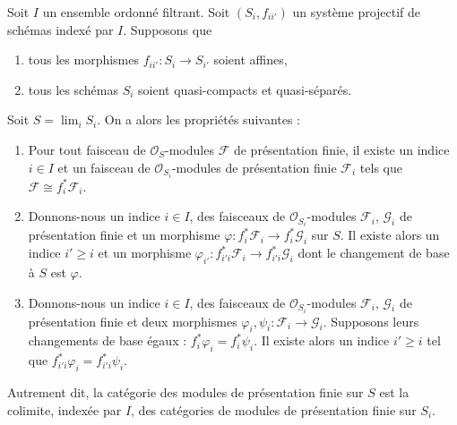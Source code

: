 \begin{lemma}
\label{lemma-descend-modules-finite-presentation}
Soit $I$ un ensemble ordonné filtrant.
Soit $(S_i, f_{ii'})$ un système projectif de schémas indexé par $I$.
Supposons que
\begin{enumerate}
\item tous les morphismes $f_{ii'} : S_i \to S_{i'}$ soient affines,
\item tous les schémas $S_i$ soient quasi-compacts et quasi-séparés.
\end{enumerate}
Soit $S = \lim_i S_i$. On a alors les propriétés suivantes :
\begin{enumerate}
\item Pour tout faisceau de $\mathcal{O}_S$-modules
$\mathcal{F}$ de présentation finie, il existe un indice
$i \in I$ et un faisceau de $\mathcal{O}_{S_i}$-modules de présentation finie
$\mathcal{F}_i$ tels que
$\mathcal{F} \cong f_i^*\mathcal{F}_i$.
\item Donnons-nous un indice $i \in I$, des faisceaux
de $\mathcal{O}_{S_i}$-modules $\mathcal{F}_i$, $\mathcal{G}_i$
de présentation finie et un morphisme
$\varphi : f_i^*\mathcal{F}_i \to f_i^*\mathcal{G}_i$ sur $S$.
Il existe alors un indice $i' \geq i$ et un morphisme
$\varphi_{i'} : f_{i'i}^*\mathcal{F}_i \to f_{i'i}^*\mathcal{G}_i$
dont le changement de base à $S$ est $\varphi$.
\item Donnons-nous un indice $i \in I$, des faisceaux de $\mathcal{O}_{S_i}$-modules
$\mathcal{F}_i$, $\mathcal{G}_i$ de présentation finie
et deux morphismes $\varphi_i, \psi_i : \mathcal{F}_i \to \mathcal{G}_i$.
Supposons leurs changements de base égaux : $f_i^*\varphi_i = f_i^*\psi_i$.
Il existe alors un indice $i' \geq i$ tel que
$f_{i'i}^*\varphi_i = f_{i'i}^*\psi_i$.
\end{enumerate}
Autrement dit, la catégorie des modules
de présentation finie sur $S$ est la colimite, indexée par $I$,
des catégories de modules de présentation finie sur $S_i$.
\end{lemma}

